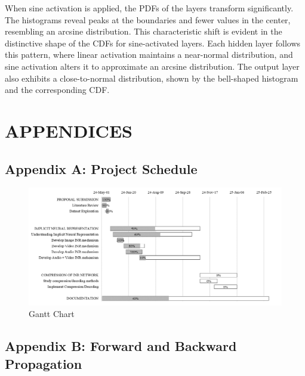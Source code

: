 \documentclass{ioereport}
\begin{document}
    When sine activation is applied, the PDFs of the layers transform significantly. The histograms reveal peaks at the boundaries and fewer values in the center, resembling an arcsine distribution. This characteristic shift is evident in the distinctive shape of the CDFs for sine-activated layers. Each hidden layer follows this pattern, where linear activation maintains a near-normal distribution, and sine activation alters it to approximate an arcsine distribution. The output layer also exhibits a close-to-normal distribution, shown by the bell-shaped histogram and the corresponding CDF. 

    \pagebreak


\section{\MakeUppercase{Appendices}}
    \subsection*{Appendix A: Project Schedule}
    \begin{figure}[H]
        \centering
        \includegraphics[angle=90, origin=c, height=0.65\textheight]{assets/Gantt.png}
        \caption{Gantt Chart}
        \label{fig:gantt}
    \end{figure}
    
\pagebreak

\subsection*{Appendix B: Forward and Backward Propagation}
\label{app:forward-backward-eqn}
\end{document}
